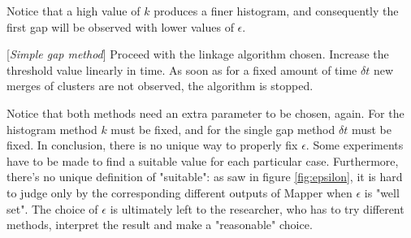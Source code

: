 Notice that a high value of $k$ produces a finer histogram, and consequently the first gap will be observed with lower values of $\epsilon$.
\begin{definition*}{[\textit{Simple gap method}]}
	Proceed with the linkage algorithm chosen. Increase the threshold value linearly in time. As soon as for a fixed amount of time $\delta t$ new merges of clusters are not observed, the algorithm is stopped.
\end{definition*}

Notice that both methods need an extra parameter to be chosen, again. For the histogram method $k$ must be fixed, and for the single gap method $\delta t$ must be fixed. In conclusion, there is no unique way to properly fix $\epsilon$. Some experiments have to be made to find a suitable value for each particular case. Furthermore, there's no unique definition of "suitable": as saw in figure \ref{fig:epsilon}, it is hard to judge only by the corresponding different outputs of Mapper when $\epsilon$ is "well set". The choice of $\epsilon$ is ultimately left to the researcher, who has to try different methods, interpret the result and make a "reasonable" choice.
